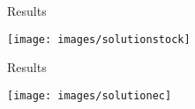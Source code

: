 \begin{frame}{Results}
    \begin{center}
    \texttt{[image: images/solutionstock]}
    \end{center}
\end{frame}

\begin{frame}{Results}
    \begin{center}
    \texttt{[image: images/solutionec]}
    \end{center}
\end{frame}
